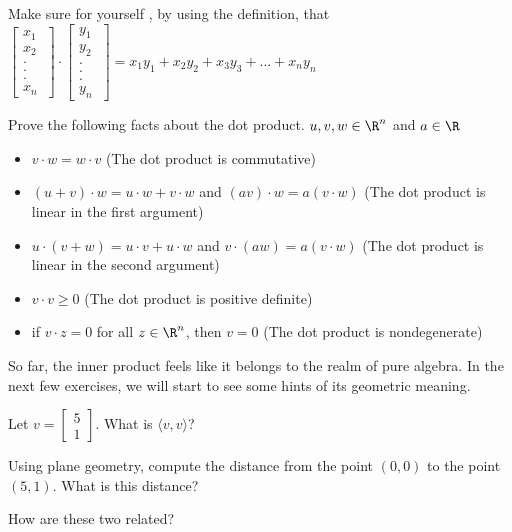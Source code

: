 \begin{question}
	Make sure for yourself , by using the definition, that 
	$\begin{bmatrix} x_1 \\x_2\\ .\\.\\. \\ x_n\ \end{bmatrix} \cdot \begin{bmatrix} y_1 \\y_2\\ .\\.\\. \\ y_n\ \end{bmatrix}  = x_1y_1+x_2y_2+x_3y_3 + ...+x_ny_n$
\end{question}

\begin{question}
	Prove the following facts about the dot product.  $u,v,w \in \R^n$ and $a \in \R$
		\begin{itemize}
			\item $v \cdot w = w \cdot v$ (The dot product is commutative)
			
			\item $(u+v)\cdot w = u\cdot w + v\cdot w$ 	and $(av)\cdot w = a(v \cdot w)$ (The dot product is linear in the first argument)
			
			\item $u \cdot (v+w) = u\cdot v+ u\cdot w$ and  $v \cdot (aw) = a(v \cdot  w)$ (The dot product is linear in the second argument)
			
			\item $v\cdot v \geq 0$ (The dot product is positive definite)
			
			\item if $v \cdot z = 0$ for all $z \in \R^n$, then $v =0$ (The dot product is nondegenerate)
		\end{itemize}
\end{question}

So far, the inner product feels like it belongs to the realm of pure algebra.  In the next few exercises, we will start to see some hints of its geometric meaning.

\begin{question}
	Let $v  = \begin{bmatrix}  5  \\ 1\end{bmatrix}$.  What is $\langle v,v\rangle$?  
	
	Using plane geometry, compute the distance from the point $(0,0)$ to the point $(5,1)$.  What is this distance?
	
	How are these two related?
\end{question}


